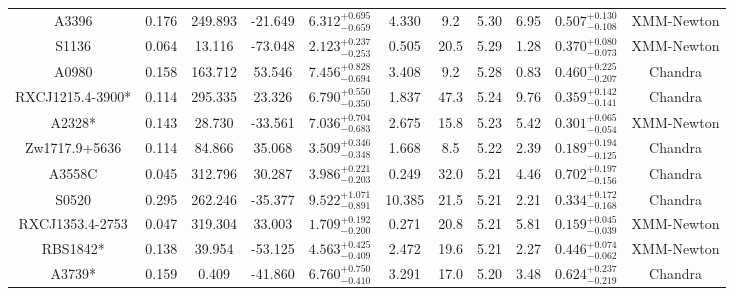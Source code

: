 \documentclass{aa}   %
\begin{document}
\begin{table}[h!]
\begin{center}
\begin{tabular}{ c  c  c  c c c c c c c c }
A3396               		&		0.176	&	249.893	&	-21.649	& $	6.312^{+0.695}_{-0.659}$  &      4.330	&  9.2	&	5.30	&	6.95	&	$ 0.507^{+0.130}_{-0.108}  $ &	 XMM-Newton   \\
S1136               		&		0.064	&	13.116	&	-73.048	& $	2.123^{+0.237}_{-0.253}$  &      0.505	&  20.5	&	5.29	&	1.28	&	$ 0.370^{+0.080}_{-0.073}  $ &	  XMM-Newton  \\
A0980               		&		0.158	&	163.712	&	53.546	& $	7.456^{+0.828}_{-0.694}$  &      3.408	&  9.2	&	5.28	&	0.83	&	$ 0.460^{+0.225}_{-0.207}  $ &	  Chandra     \\
RXCJ1215.4-3900*    		&		0.114	&	295.335	&	23.326	& $	6.790^{+0.550}_{-0.350}$  &      1.837	&  47.3	&	5.24	&	9.76	&	$ 0.359^{+0.142}_{-0.141}  $ &	 Chandra      \\
A2328*              		&		0.143	&	28.730	&	-33.561	& $	7.036^{+0.704}_{-0.683}$  &      2.675	&  15.8	&	5.23	&	5.42	&	$ 0.301^{+0.065}_{-0.054}  $ &	  XMM-Newton  \\
Zw1717.9+5636       		&		0.114	&	84.866	&	35.068	& $	3.509^{+0.346}_{-0.348}$  &      1.668	&  8.5	&	5.22	&	2.39	&	$ 0.189^{+0.194}_{-0.125}  $ &	  Chandra     \\
A3558C              		&		0.045	&	312.796	&	30.287	& $	3.986^{+0.221}_{-0.203}$  &      0.249	&  32.0	&	5.21	&	4.46	&	$ 0.702^{+0.197}_{-0.156}  $ &	  Chandra     \\
S0520               		&		0.295	&	262.246	&	-35.377	& $	9.522^{+1.071}_{-0.891}$  &     10.385	&  21.5	&	5.21	&	2.21	&	$ 0.334^{+0.172}_{-0.168}  $ &	 Chandra      \\
RXCJ1353.4-2753     		&		0.047	&	319.304	&	33.003	& $	1.709^{+0.192}_{-0.200}$  &      0.271	&  20.8	&	5.21	&	5.81	&	$ 0.159^{+0.045}_{-0.039}  $ &	 XMM-Newton   \\
RBS1842*            		&		0.138	&	39.954	&	-53.125	& $	4.563^{+0.425}_{-0.409}$  &      2.472	&  19.6	&	5.21	&	2.27	&	$ 0.446^{+0.074}_{-0.062}  $ &	  XMM-Newton  \\
A3739*              		&		0.159	&	0.409	&	-41.860	& $	6.760^{+0.750}_{-0.410}$  &      3.291	&  17.0	&	5.20	&	3.48	&	$ 0.624^{+0.237}_{-0.219}  $ &	  Chandra     \\


 \hline 
 

\end{tabular}
\end{center}
\end{table}
\end{document}
